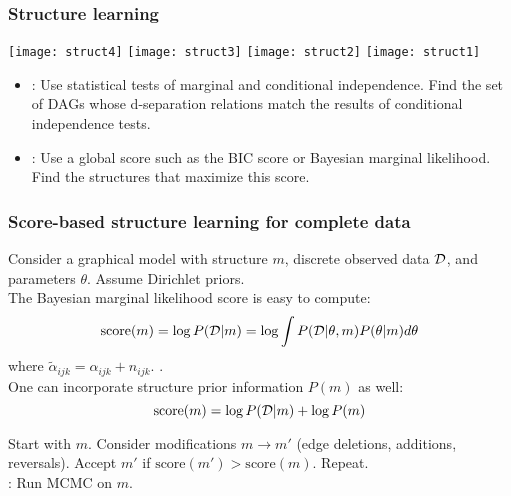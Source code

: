 \begin{frame}
\frametitle{Structure learning}

\vspace{2ex}

\centerline{
\texttt{[image: struct4]} \hspace{2ex}
\texttt{[image: struct3]}\hspace{2ex}
\texttt{[image: struct2]}\hspace{2ex}
\texttt{[image: struct1]}
}

\vspace{4ex}

\begin{itemize}
\item[] : Use statistical tests of
  marginal and conditional independence. Find the set of DAGs whose
  d-separation relations match the results of conditional independence tests.

\item[] : Use a global score such as
  the BIC score or Bayesian marginal likelihood. Find the structures
  that maximize this score.
\end{itemize}


\end{frame}
\begin{frame}
\frametitle{Score-based structure learning for complete data}

Consider a graphical model with structure $m$, discrete observed data
$\mathcal{D}$, and parameters $\theta$. Assume Dirichlet priors.\\[2ex]

The Bayesian marginal likelihood score is easy to compute:
\vspace*{-1ex}
\[
\mbox{score}(m) = \log P(\mathcal{D}|m) = \log \int P(\mathcal{D}|\theta,m) P(\theta|m) d \theta
\]
\vspace*{-2ex}
\Green{\small \[
\mbox{score}(m) = \sum_i \sum_j \left[ 
\log \Gamma(\sum_k  \alpha_{ijk}) - \sum_k \log \Gamma(\alpha_{ijk}) 
- \log \Gamma(\sum_k  \tilde{\alpha}_{ijk}) + \sum_k \log
\Gamma(\tilde{\alpha}_{ijk})  
\right]
\]}
where $\tilde{\alpha}_{ijk} = \alpha_{ijk} + n_{ijk}$. .\\

One can incorporate structure prior information $P(m)$ as well:
\[
\mbox{score}(m) = \log P(\mathcal{D}|m)  + \log P(m)
\]

 Start with $m$. Consider modifications
$m \rightarrow m'$ (edge deletions, additions, reversals). Accept $m'$
if $\mbox{score}(m') >\mbox{score}(m)$. Repeat.\\[2ex]

: Run MCMC on $m$.

\end{frame}
